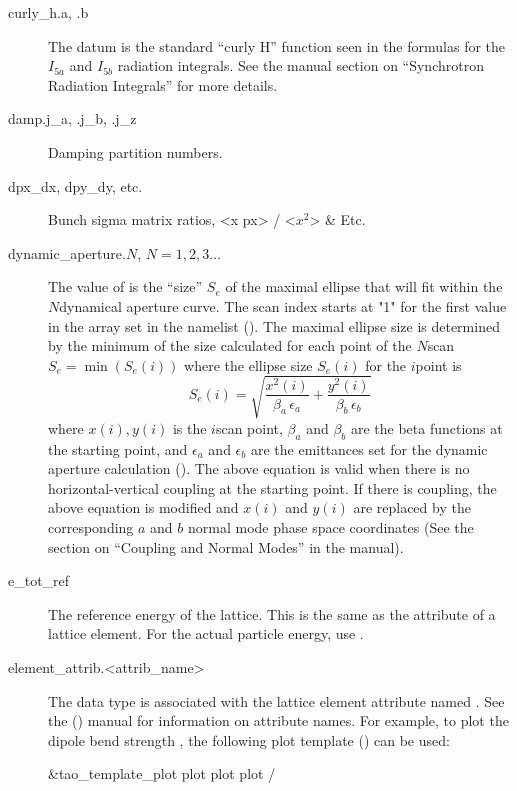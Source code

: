 \begin{description}
  \item[curly_h.a, .b] \Newline {}
The  datum is the standard ``curly H'' function seen in the formulas for the $I_{5a}$
and $I_{5b}$ radiation integrals. See the \bmad manual section on ``Synchrotron Radiation Integrals''
for more details.

  \item[damp.j_a, .j_b, .j_z] \Newline {}
Damping partition numbers.

  \item[dpx_dx, dpy_dy, etc.] \Newline {}
Bunch sigma matrix ratios, <x px> / <$x^2$> \& Etc.

  \item[dynamic_aperture.$N$, $N = 1, 2, 3 \ldots$] \Newline {}
The value of  is the ``size'' $S_e$ of the maximal ellipse that will fit
within the $N$\Th dynamical aperture curve. The scan index starts at "1" for the first value in the
 array set in the  namelist (). The maximal
ellipse size is determined by the minimum of the size calculated for each point of the $N$\Th scan
$S_e = \min(S_e(i))$ where the ellipse size $S_e(i)$ for the $i$\Th point is
\begin{equation}
  S_e(i) = \sqrt{ \frac{x^2(i)}{\beta_a \, \epsilon_a} + \frac{y^2(i)}{\beta_b \, \epsilon_b} }
\end{equation} 
where $x(i), y(i)$ is the $i$\Th scan point, $\beta_a$ and $\beta_b$ are the beta functions at the
starting point, and $\epsilon_a$ and $\epsilon_b$ are the emittances set for the dynamic aperture
calculation (). The above equation is valid when there is no horizontal-vertical
coupling at the starting point. If there is coupling, the above equation is modified and $x(i)$ and
$y(i)$ are replaced by the corresponding $a$ and $b$ normal mode phase space coordinates (See the section
on ``Coupling and Normal Modes'' in the \bmad manual).

  \item[e_tot_ref] \Newline {}
The reference energy of the lattice. This is the same as the  attribute of a lattice element.
For the actual particle energy, use .

  \item[element_attrib.<attrib_name>] \Newline {}
The  data type is associated with the
lattice element attribute named . See the \bmad
(\cite{b:bmad}) manual for information on attribute names. For
example, to plot the dipole bend strength , the following
plot template () can be used:
\begin{example}
  &tao_template_plot
    plot%
    plot%
    plot%
  /


\end{example}
\end{description}

